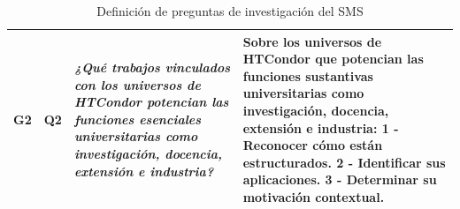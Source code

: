 \begin{table}[H]
\begin{tabular}{|p{0.7cm}|p{1.3cm}|p{5.5cm}|p{6cm}|}
		G2                                                                                                                                                                                                                                                                                                                                               & Q2                &
		\textit{¿Qué trabajos vinculados con los universos de HTCondor potencian las funciones esenciales universitarias como investigación, docencia, extensión e industria?}                                                                                                                                                                           &
		Sobre los universos de HTCondor que potencian las funciones sustantivas universitarias como investigación, docencia, extensión e industria: 1 - Reconocer cómo están estructurados. 2 - Identificar sus aplicaciones. 3 - Determinar su motivación contextual.                                                                                                                                                           \\ \hline
	\end{tabular}
	\caption{Definición de preguntas de investigación del SMS}
	\label{tab:preguntas}
\end{table}

